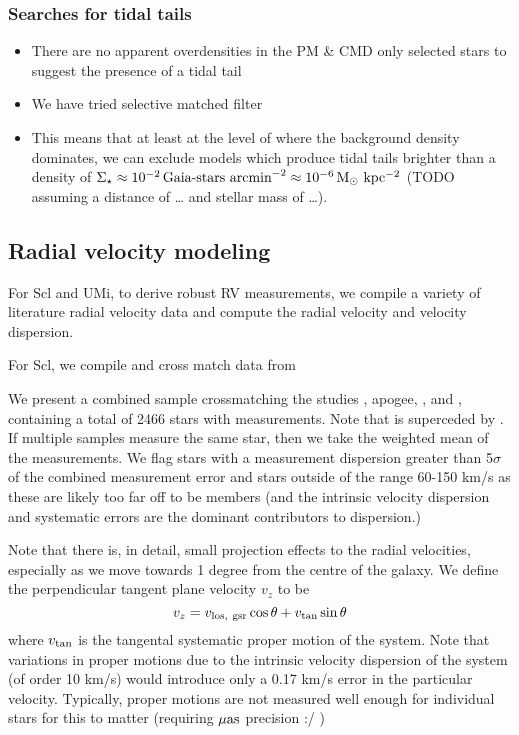 \subsubsection{Searches for tidal tails}\label{searches-for-tidal-tails}

\begin{itemize}
\item
  There are no apparent overdensities in the PM \& CMD only selected
  stars to suggest the presence of a tidal tail
\item
  We have tried selective matched filter
\item
  This means that at least at the level of where the background density
  dominates, we can exclude models which produce tidal tails brighter
  than a density of
  \(\Sigma_\star \approx 10^{-2}\,\text{Gaia-stars\ arcmin}^{-2} \approx 10^{-6} \, {\rm M_\odot\ kpc^{-2}}\)
  (TODO assuming a distance of \ldots{} and stellar mass of \ldots).
\end{itemize}

\subsection{Radial velocity modeling}\label{radial-velocity-modeling}

For Scl and UMi, to derive robust RV measurements, we compile a variety
of literature radial velocity data and compute the radial velocity and
velocity dispersion.

For Scl, we compile and cross match data from

We present a combined sample crossmatching the studies
\citep{sestito+23}, apogee, \citep{walker+2009}, and \citet{tolstoy+23},
containing a total of 2466 stars with measurements. Note that
\citet{battaglia+2009} is superceded by \citet{tolstoy+23}. If multiple
samples measure the same star, then we take the weighted mean of the
measurements. We flag stars with a measurement dispersion greater than
5\(\sigma\) of the combined measurement error and stars outside of the
range 60-150 km/s as these are likely too far off to be members (and the
intrinsic velocity dispersion and systematic errors are the dominant
contributors to dispersion.)

Note that there is, in detail, small projection effects to the radial
velocities, especially as we move towards 1 degree from the centre of
the galaxy. We define the perpendicular tangent plane velocity \(v_z\)
to be \[
v_z = v_{\rm los,\ gsr} \cos\theta + v_{\rm tan} \sin\theta
\] where \(v_{\rm tan}\) is the tangental systematic proper motion of
the system. Note that variations in proper motions due to the intrinsic
velocity dispersion of the system (of order 10 km/s) would introduce
only a 0.17 km/s error in the particular velocity. Typically, proper
motions are not measured well enough for individual stars for this to
matter (requiring \(\mu {\rm as}\) precision :/ )

